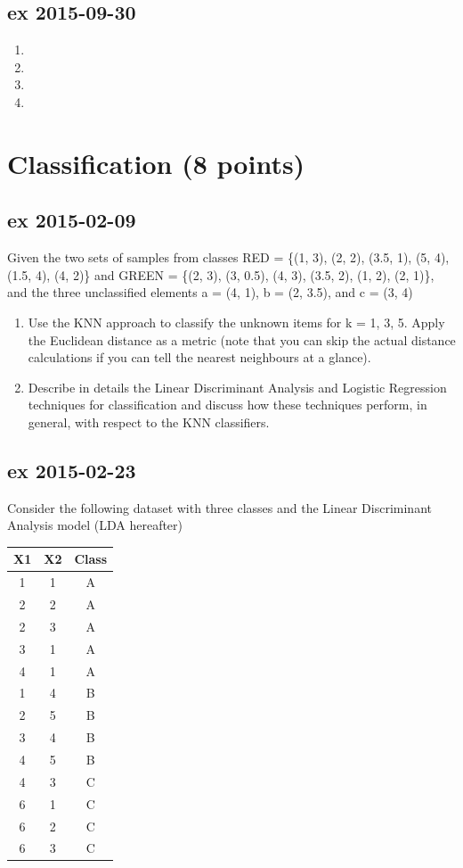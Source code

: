 \documentclass[a4paper,12pt,titlepage]{article} %
\begin{document}
\subsection{ex 2015-09-30}
\begin{enumerate}
\item
\item
\item
\item 
\end{enumerate}

\section{Classification (8 points)}
\subsection{ex 2015-02-09}
Given the two sets of samples from classes RED = \{(1, 3), (2, 2), (3.5, 1), (5, 4), (1.5, 4), (4, 2)\} and GREEN = \{(2, 3), (3, 0.5), (4, 3), (3.5, 2), (1, 2), (2, 1)\}, and the three unclassified elements a = (4, 1), b = (2, 3.5), and c = (3, 4)
\begin{enumerate}
\item Use the KNN approach to classify the unknown items for k = 1, 3, 5. Apply the Euclidean distance as a metric (note that you can skip the actual distance calculations if you can tell the nearest neighbours at a glance).
\item Describe in details the Linear Discriminant Analysis and Logistic Regression techniques for classification and discuss how these techniques perform, in general, with respect to the KNN classifiers.
\end{enumerate}

\subsection{ex 2015-02-23}
Consider the following dataset with three classes and the Linear Discriminant Analysis
model (LDA hereafter)
\begin{center}
  \begin{tabular}{cc|c}
    X1 & X2  & Class \\
    \hline
    \hline
    1 & 1 & A \\
    2 & 2 & A \\
    2 & 3 & A \\
    3 & 1 & A \\
    4 & 1 & A \\
    \hline
    1 & 4 & B \\
    2 & 5 & B \\
    3 & 4 & B \\
    4 & 5 & B \\
    \hline
    4 & 3 & C \\
    6 & 1 & C \\
    6 & 2 & C \\
    6 & 3 & C \\
    \hline
  \end{tabular}
\end{center}
\end{document}
